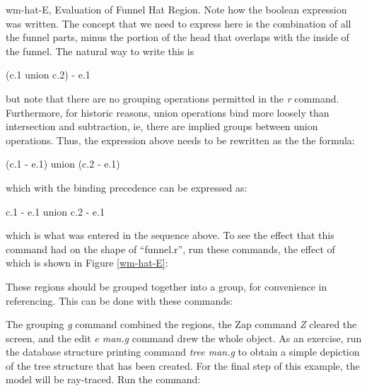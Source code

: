 \mfig wm-hat-E, Evaluation of Funnel Hat Region.
Note how the boolean expression was written.
The concept that we need to express here is
the combination of all the funnel parts, minus the
portion of the head that overlaps with the inside of the funnel.
The natural way to write this is
\begin{center}
(c.1 union c.2) - e.1
\end{center}
but note that there are no grouping operations permitted in the {\em r}
command.
Furthermore, for historic reasons, union operations bind more loosely than
intersection and subtraction, ie, there are implied groups
between union operations.  Thus, the expression above needs to be
rewritten as the the formula:
\begin{center}
(c.1 - e.1) union (c.2 - e.1)
\end{center}
which with the binding precedence can be expressed as:
\begin{center}
c.1 - e.1 union c.2 - e.1
\end{center}
which is what was entered in the sequence above.
To see the effect that this command had on the shape of ``funnel.r'',
run these commands, the effect of which is shown in Figure \ref{wm-hat-E}:


These regions should be grouped together into a group,
for convenience in referencing.  This can be done with these commands:


The grouping {\em g} command combined the regions, the Zap command {\em Z}
cleared the screen, and the edit {\em e man.g} command drew the whole
object.
As an exercise, run
the database structure printing command {\em tree man.g}
to obtain a simple depiction of the tree structure that has been created.
For the final step of this example, the model will be ray-traced.
Run the command:

